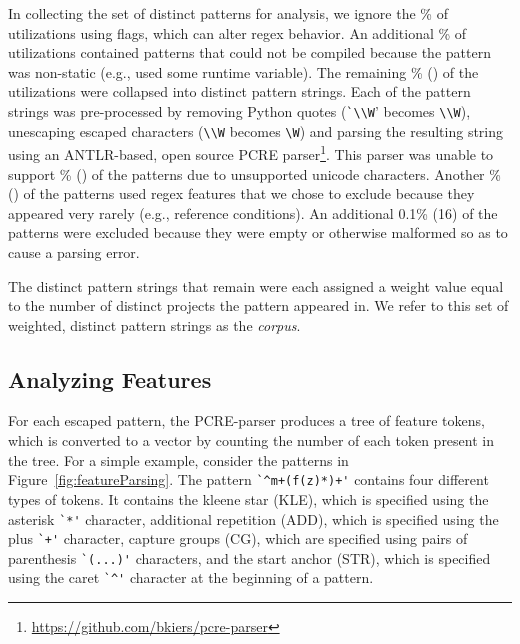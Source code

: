 In collecting the set of distinct patterns for analysis,  we ignore the \%  of utilizations using flags, which can alter regex behavior.  An additional \% of utilizations contained patterns that could not be compiled because the pattern was non-static (e.g., used some runtime variable).
The remaining \% () of the utilizations were collapsed into  distinct pattern strings.  Each of the pattern strings was pre-processed by removing Python quotes (\verb!`\\W!' becomes \verb!\\W!), unescaping escaped characters (\verb!\\W! becomes \verb!\W!) and parsing the resulting  string using an ANTLR-based, open source PCRE parser\footnote{\url{https://github.com/bkiers/pcre-parser}}.
This parser was unable to support \% () of the patterns due to unsupported unicode characters.  Another \% () of the patterns used regex features that we  chose to exclude because they appeared very rarely (e.g., reference conditions).  An additional 0.1\% (16) of the patterns were excluded because they were empty or otherwise malformed so as to cause a parsing error.

The  distinct pattern strings that remain were each assigned a weight value equal to the number of distinct projects the pattern appeared in.  We  refer to this set of weighted, distinct pattern strings as the \emph{corpus}.

\subsection{Analyzing Features}
\label{study:features}
For each escaped pattern, the PCRE-parser produces a tree of feature tokens, which is converted to a vector by counting the number of each token present in the tree.  For a simple example, consider the patterns in Figure~\ref{fig:featureParsing}.  The pattern \verb!`^m+(f(z)*)+'! contains four different types of tokens. It contains the kleene star (KLE), which is specified using the asterisk \verb!`*'! character, additional repetition (ADD), which is specified using the plus \verb!`+'! character, capture groups (CG), which are specified using pairs of parenthesis \verb!`(...)'! characters, and the start anchor (STR), which is specified using the caret \verb!`^'! character at the beginning of a pattern.

